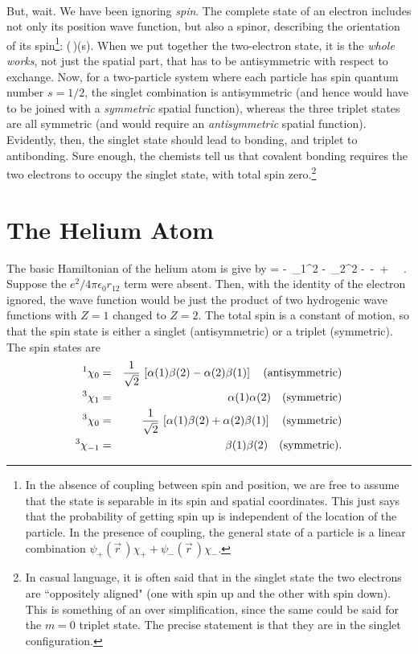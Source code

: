 \paragraph{}
But, wait. We have been ignoring \textit{spin}. The complete state of an electron includes not only its position wave function, but also a spinor, describing the orientation of its spin\footnote{In the absence of coupling between spin and position, we are free to assume that the state is separable in its spin and spatial coordinates. This just says that the probability of getting spin up is independent of the location of the particle. In the presence of coupling, the general state of a particle is a linear combination
	$\psi_+(\vec{r}\,)\chi_+ + \psi_-(\vec{r}\,)\chi_-$.}:
\be
\psi(\,)\chi(s).
\ee
When we put together the two-electron state, it is the \textit{whole works}, not just the spatial part, that has to be antisymmetric with respect to exchange. Now, for a two-particle system where each particle has spin quantum number $s=1/2$, the singlet combination is antisymmetric (and hence would have to be joined with a \textit{symmetric} spatial function), whereas the three 
triplet states are all symmetric (and would require an \textit{antisymmetric} spatial function). Evidently, then, the singlet state should lead to bonding, and triplet to antibonding. Sure enough, the chemists tell us that covalent bonding requires the two electrons to occupy the singlet state, with total spin zero.\footnote{In casual language, it is often said that in the singlet state the two electrons are ``oppositely aligned" (one with spin up and the other with spin down). This is something of an over simplification, since the same could be said for the $m=0$ triplet state. The precise statement is that they are in the singlet configuration.}



\section{The Helium Atom}
The basic Hamiltonian of the helium atom is give by
\be
{} = -\, \nabla_1^2 -\, \nabla_2^2 -\,  
-\,  + \, \, .
\ee
Suppose the $e^2/4\pi\epsilon_0 r_{12}$ term were absent. Then, with the identity of the electron ignored, the wave function would be just the product of two hydrogenic wave functions with $Z=1$ changed to $Z=2$. The total spin is a constant of motion, so that the spin state is either a singlet (antisymmetric) or a triplet (symmetric). The spin states are
\begin{eqnarray}
^1\chi_0 & = & \frac{1}{\sqrt{2}}\, \left[ \alpha(1)\beta(2)-\alpha(2)\beta(1)\right ] \quad {\rm (antisymmetric)} \\
^3\chi_1 & = & \alpha(1)\alpha(2) \quad {\rm (symmetric)}\\
^3\chi_0 & = & \frac{1}{\sqrt{2}}\, \left[ \alpha(1)\beta(2) + \alpha(2)\beta(1) \right ] \quad {\rm (symmetric)} \\
^3\chi_{-1} & = & \beta(1)\beta(2) \quad {\rm (symmetric)}.
\end{eqnarray}

